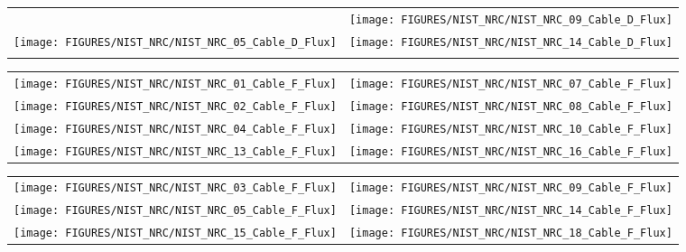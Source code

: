 \begin{figure}[p]
\begin{tabular*}{\textwidth}{l@{\extracolsep{\fill}}r}
                           &
\texttt{[image: FIGURES/NIST\_NRC/NIST\_NRC\_09\_Cable\_D\_Flux]} \\
\texttt{[image: FIGURES/NIST\_NRC/NIST\_NRC\_05\_Cable\_D\_Flux]} &
\texttt{[image: FIGURES/NIST\_NRC/NIST\_NRC\_14\_Cable\_D\_Flux]} \\
                      &
\end{tabular*}
\label{NIST_NRC_Cable_D_Flux_Open}
\end{figure}

\begin{figure}[p]
\begin{tabular*}{\textwidth}{l@{\extracolsep{\fill}}r}
\texttt{[image: FIGURES/NIST\_NRC/NIST\_NRC\_01\_Cable\_F\_Flux]} &
\texttt{[image: FIGURES/NIST\_NRC/NIST\_NRC\_07\_Cable\_F\_Flux]} \\
\texttt{[image: FIGURES/NIST\_NRC/NIST\_NRC\_02\_Cable\_F\_Flux]} &
\texttt{[image: FIGURES/NIST\_NRC/NIST\_NRC\_08\_Cable\_F\_Flux]} \\
\texttt{[image: FIGURES/NIST\_NRC/NIST\_NRC\_04\_Cable\_F\_Flux]} &
\texttt{[image: FIGURES/NIST\_NRC/NIST\_NRC\_10\_Cable\_F\_Flux]} \\
\texttt{[image: FIGURES/NIST\_NRC/NIST\_NRC\_13\_Cable\_F\_Flux]} &
\texttt{[image: FIGURES/NIST\_NRC/NIST\_NRC\_16\_Cable\_F\_Flux]}
\end{tabular*}
\label{NIST_NRC_Cable_F_Flux_Closed}
\end{figure}

\begin{figure}[p]
\begin{tabular*}{\textwidth}{l@{\extracolsep{\fill}}r}
\texttt{[image: FIGURES/NIST\_NRC/NIST\_NRC\_03\_Cable\_F\_Flux]} &
\texttt{[image: FIGURES/NIST\_NRC/NIST\_NRC\_09\_Cable\_F\_Flux]} \\
\texttt{[image: FIGURES/NIST\_NRC/NIST\_NRC\_05\_Cable\_F\_Flux]} &
\texttt{[image: FIGURES/NIST\_NRC/NIST\_NRC\_14\_Cable\_F\_Flux]} \\
\texttt{[image: FIGURES/NIST\_NRC/NIST\_NRC\_15\_Cable\_F\_Flux]} &
\texttt{[image: FIGURES/NIST\_NRC/NIST\_NRC\_18\_Cable\_F\_Flux]}
\end{tabular*}
\label{NIST_NRC_Cable_F_Flux_Open}
\end{figure}

